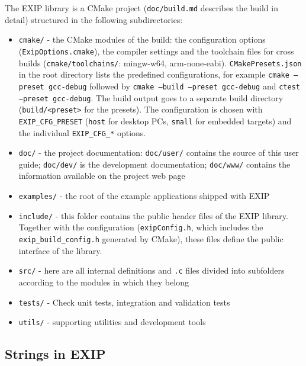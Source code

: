 The EXIP library is a CMake project (\texttt{doc/build.md} describes the build in detail)
structured in the following subdirectories:
\begin{itemize}
 \item \texttt{cmake/} - the CMake modules of the build: the configuration options
(\texttt{ExipOptions.cmake}), the compiler settings and the toolchain files for cross builds
(\texttt{cmake/toolchains/}: mingw-w64, arm-none-eabi). \texttt{CMakePresets.json} in the root
directory lists the predefined configurations, for example \texttt{cmake --preset gcc-debug}
followed by \texttt{cmake --build --preset gcc-debug} and \texttt{ctest --preset gcc-debug}.
The build output goes to a separate build directory (\texttt{build/<preset>} for the presets).
The configuration is chosen with \texttt{EXIP\_CFG\_PRESET} (\texttt{host} for desktop PCs,
\texttt{small} for embedded targets) and the individual \texttt{EXIP\_CFG\_*} options.

 \item \texttt{doc/} - the project documentation: \texttt{doc/user/} contains the source of this user guide;
    \texttt{doc/dev/} is the development documentation; 
  \texttt{doc/www/} contains the information available on the project web page

 \item \texttt{examples/} - the root of the example applications shipped with EXIP

 \item \texttt{include/} - this folder contains the public header files of the EXIP library.
			  Together with the configuration (\texttt{exipConfig.h}, which includes the
			  \texttt{exip\_build\_config.h} generated by CMake), these files define the public
			  interface of the library.

 \item \texttt{src/} - here are all internal definitions and \texttt{.c} files divided into
	      subfolders according to the modules in which they belong

 \item \texttt{tests/} - Check unit tests, integration and validation tests

 \item \texttt{utils/} - supporting utilities and development tools

\end{itemize}


\subsection{Strings in EXIP}
\label{sec:strings}

